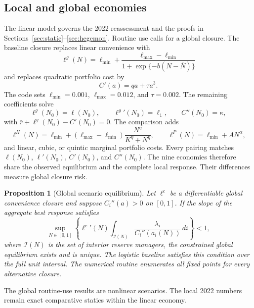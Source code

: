 \documentclass[11pt]{article}
\newtheorem{proposition}{Proposition}
\theoremstyle{definition}
\begin{document}
\subsection{Local and global economies}

The linear model governs the 2022 reassessment and the proofs in Sections~\ref{sec:static}--\ref{sec:hegemon}. Routine use calls for a global closure. The baseline closure replaces linear convenience with
\begin{equation}
\ell^g(N)=\ell_{\min}+\frac{\ell_{\max}-\ell_{\min}}{1+\exp\{-b(N-\bar N)\}}
\label{eq:globalell}
\end{equation}
and replaces quadratic portfolio cost by
\begin{equation}
C'(a)=q a+\tau a^3.
\label{eq:globalcost}
\end{equation}
The code sets $\ell_{\min}=0.001$, $\ell_{\max}=0.012$, and $\tau=0.002$. The remaining coefficients solve
\begin{equation}
\ell^g(N_0)=\ell(N_0),\qquad
{\ell^g}'(N_0)=\ell_1,\qquad
C''(N_0)=\kappa,
\label{eq:globalmatch}
\end{equation}
with $\bar r+\ell^g(N_0)-C'(N_0)=0$. The comparison adds
\[
\ell^H(N)=\ell_{\min}+(\ell_{\max}-\ell_{\min})
\frac{N^\eta}{K^\eta+N^\eta},
\qquad
\ell^P(N)=\ell_{\min}+AN^\alpha,
\]
and linear, cubic, or quintic marginal portfolio costs. Every pairing matches $\ell(N_0)$, $\ell'(N_0)$, $C'(N_0)$, and $C''(N_0)$. The nine economies therefore share the observed equilibrium and the complete local response. Their differences measure global closure risk.

\begin{proposition}[Global scenario equilibrium]\label{prop:global}
Let $\ell^c$ be a differentiable global convenience closure and suppose $C_i''(a)>0$ on $[0,1]$. If the slope of the aggregate best response satisfies
\begin{equation}
\sup_{N\in[0,1]}\left\{{\ell^c}'(N)\int_{\mathcal I(N)}\frac{\lambda_i}{C_i''(a_i(N))}\,di\right\}<1,
\label{eq:globalcontraction}
\end{equation}
where $\mathcal I(N)$ is the set of interior reserve managers, the constrained global equilibrium exists and is unique. The logistic baseline satisfies this condition over the full unit interval. The numerical routine enumerates all fixed points for every alternative closure.
\end{proposition}

The global routine-use results are nonlinear scenarios. The local 2022 numbers remain exact comparative statics within the linear economy.
\end{document}
